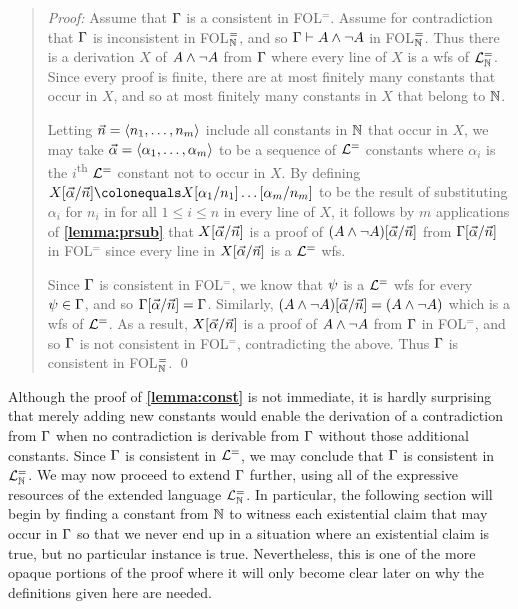 \begin{quote} 
  \textit{Proof:} Assume that $\Gamma$ is a consistent in FOL$^=$.
  Assume for contradiction that $\Gamma$ is inconsistent in FOL$^=_{\mathbb{N}}$, and so $\Gamma\vdash A\wedge\neg A$ in FOL$^=_{\mathbb{N}}$.
  Thus there is a derivation $X$ of $A\wedge\neg A$ from $\Gamma$ where every line of $X$ is a wfs of $\mathcal{L}^{=}_{\mathbb{N}}$.
  Since every proof is finite, there are at most finitely many constants that occur in $X$, and so at most finitely many constants in $X$ that belong to $\mathbb{N}$.

  Letting $\vec{n}=\langle n_1,\ldots,n_m\rangle$ include all constants in $\mathbb{N}$ that occur in $X$, we may take $\vec{\alpha}=\langle\alpha_1,\ldots,\alpha_m\rangle$ to be a sequence of $\mathcal{L}^{=}$ constants where $\alpha_i$ is the $i$\textsuperscript{th} $\mathcal{L}^{=}$ constant not to occur in $X$.
  By defining $X\unisub{\vec{\alpha}}{\vec{n}}\colonequals X\unisub{\alpha_1}{n_1}\ldots\unisub{\alpha_m}{n_m}$ to be the result of substituting $\alpha_i$ for $n_i$ in for all $1\leq i\leq n$ in every line of $X$, it follows by $m$ applications of \textbf{\ref{lemma:prsub}} that $X[\vec{\alpha}/\vec{n}]$ is a proof of $(A\wedge\neg A)[\vec{\alpha}/\vec{n}]$ from $\Gamma[\vec{\alpha}/\vec{n}]$ in FOL$^=$ since every line in $X[\vec{\alpha}/\vec{n}]$ is a $\mathcal{L}^{=}$ wfs.

  Since $\Gamma$ is consistent in FOL$^=$, we know that $\psi$ is a $\mathcal{L}^{=}$ wfs for every $\psi\in\Gamma$, and so $\Gamma[\vec{\alpha}/\vec{n}]=\Gamma$.
  Similarly, $(A\wedge\neg A)[\vec{\alpha}/\vec{n}]=(A\wedge\neg A)$ which is a wfs of $\mathcal{L}^{=}$. 
  As a result, $X[\vec{\alpha}/\vec{n}]$ is a proof of $A\wedge\neg A$ from $\Gamma$ in FOL$^=$, and so $\Gamma$ is not consistent in FOL$^=$, contradicting the above.
  Thus $\Gamma$ is consistent in FOL$^=_{\mathbb{N}}$.
  \qed
\end{quote}

Although the proof of \textbf{\ref{lemma:const}} is not immediate, it is hardly surprising that merely adding new constants would enable the derivation of a contradiction from $\Gamma$ when no contradiction is derivable from $\Gamma$ without those additional constants.
Since $\Gamma$ is consistent in $\mathcal{L}^{=}$, we may conclude that $\Gamma$ is consistent in $\mathcal{L}^{=}_{\mathbb{N}}$.
We may now proceed to extend $\Gamma$ further, using all of the expressive resources of the extended language $\mathcal{L}^{=}_{\mathbb{N}}$. 
In particular, the following section will begin by finding a constant from $\mathbb{N}$ to witness each existential claim that may occur in $\Gamma$ so that we never end up in a situation where an existential claim is true, but no particular instance is true. 
Nevertheless, this is one of the more opaque portions of the proof where it will only become clear later on why the definitions given here are needed.





